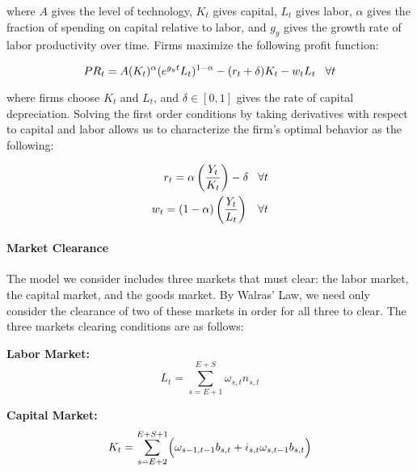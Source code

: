 \documentclass[10pt]{article}
\numberwithin{equation}{subsection}
\begin{document}
\begin{appendices}
\noindent where \(A\) gives the level of technology, \(K_t\) gives capital, \(L_t\) gives labor, \(\alpha\) gives the fraction of spending on capital relative to labor, and \(g_y\) gives the growth rate of labor productivity over time. Firms maximize the following profit function:

\begin{equation}
   PR_t = A(K_t)^\alpha(e^{g_yt}L_t)^{1-\alpha} - (r_t + \delta)K_t - w_tL_t \hspace{3mm} \forall t \label{eq:firm_profit}
\end{equation}

\noindent where firms choose \(K_t\) and \(L_t\), and \(\delta \in [0, 1]\) gives the rate of capital depreciation. Solving the first order conditions by taking derivatives with respect to capital and labor allows us to characterize the firm's optimal behavior as the following:

\begin{align}
   r_t = \alpha\left(\frac{Y_t}{K_t}\right) - \delta \hspace{3mm} \forall t \\
   w_t = (1-\alpha)\left(\frac{Y_t}{L_t}\right)\hspace{3mm} \forall t
\end{align}


\paragraph{Market Clearance}

\par The model we consider includes three markets that must clear: the labor market, the capital market, and the goods market. By Walras' Law, we need only consider the clearance of two of these markets in order for all three to clear. The three markets clearing conditions are as follows:

\textbf{Labor Market:}
\begin{equation}
   L_t = \sum_{s=E+1}^{E+S}\omega_{s,t}n_{s,t}
\end{equation}

\textbf{Capital Market:}
\begin{equation}
   K_t = \sum_{s=E+2}^{E+S+1}\Bigl(\omega_{s-1,t-1}b_{s,t}+i_{s,t}\omega_{s,t-1}b_{s,t}\Bigr)
\end{equation}


\end{appendices}
\end{document}
